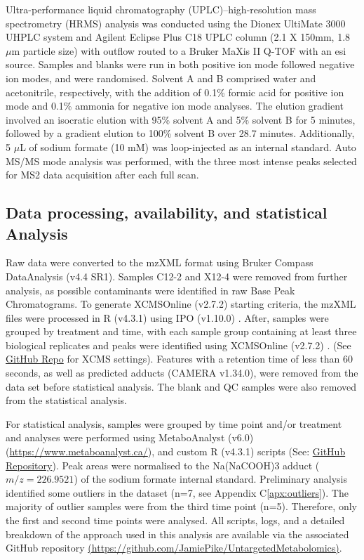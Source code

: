 Ultra-performance liquid chromatography (UPLC)–high-resolution mass spectrometry (HRMS) analysis was conducted using the Dionex UltiMate 3000 UHPLC system and Agilent Eclipse Plus C18 UPLC column (2.1 X 150mm, 1.8 \(\mu\)m particle size) with outflow routed to a Bruker MaXis II Q-TOF with an \ac{esi} source. Samples and blanks were run in both positive ion mode followed negative ion modes, and were randomised. Solvent A and B comprised water and acetonitrile, respectively, with the addition of 0.1\% formic acid for positive ion mode and 0.1\% ammonia for negative ion mode analyses. The elution gradient involved an isocratic elution with 95\% solvent A and 5\% solvent B for 5 minutes, followed by a gradient elution to 100\% solvent B over 28.7 minutes. Additionally, 5 \(\mu\)L of sodium formate (10 mM) was loop-injected as an internal standard. Auto MS/MS mode analysis was performed, with the three most intense peaks selected for MS2 data acquisition after each full scan.

\subsection{Data processing, availability, and statistical Analysis}
\label{sec:XCMS}
Raw data were converted to the mzXML format using Bruker Compass DataAnalysis (v4.4 SR1). Samples C12-2 and X12-4 were removed from further analysis, as possible contaminants were identified in raw Base Peak Chromatograms. To generate XCMSOnline  (v2.7.2) \parencite{Gowda2014} starting criteria, the mzXML files were processed in R (v4.3.1) \parencite{R} using IPO (v1.10.0) \parencite{Libiseller2015}. After, samples were grouped by treatment and time, with each sample group containing at least three biological replicates and peaks were identified using  XCMSOnline (v2.7.2) \parencite{Gowda2014}. (See \href{https://github.com/JamiePike/UntargetedMetabolomics/tree/main/NovDec22/XCMS}{GitHub Repo} for XCMS settings). Features with a retention time of less than 60 seconds, as well as predicted adducts (CAMERA v1.34.0), were removed from the data set before statistical analysis. The blank and QC samples were also removed from the statistical analysis.

For statistical analysis, samples were grouped by time point and/or treatment and analyses were performed using MetaboAnalyst (v6.0) (\href{https://www.metaboanalyst.ca/}{https://www.metaboanalyst.ca/}), and custom R (v4.3.1) \parencite{R} scripts (See: \href{https://github.com/JamiePike/UntargetedMetabolomics/tree/main}{GitHub Repository}). Peak areas were normalised to the Na(NaCOOH)3 adduct ($m/z=226.9521$) of the sodium formate internal standard. Preliminary analysis identified some outliers in the dataset (n=7, see Appendix C\ref{apx:outliers}). The majority of outlier samples were from the third time point (n=5). Therefore, only the first and second time points were analysed. All scripts, logs, and a detailed breakdown of the approach used in this analysis are available via the associated GitHub repository \href{https://github.com/JamiePike/UntargetedMetabolomics}{ (https://github.com/JamiePike/UntargetedMetabolomics)}. 

